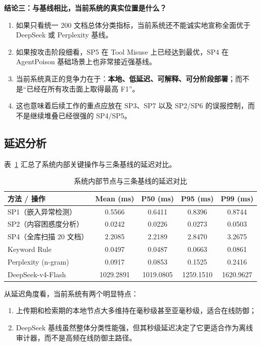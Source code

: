 \documentclass[11pt,a4paper]{ctexart}
\begin{document}
\textbf{结论三：与基线相比，当前系统的真实位置是什么？}
\begin{enumerate}[leftmargin=2em]
  \item 如果只看统一 200 文档总体分类指标，当前系统还不能诚实地宣称全面优于 DeepSeek 或 Perplexity 基线。
  \item 如果按攻击阶段细看，SP5 在 Tool Misuse 上已经达到最优，SP4 在 AgentPoison 基础场景上也非常接近强基线。
  \item 当前系统真正的竞争力在于：\textbf{本地、低延迟、可解释、可分阶段部署}；而不是“已经在所有攻击面上取得最高 F1”。
  \item 这也意味着后续工作的重点应放在 SP3、SP7 以及 SP2/SP6 的误报控制，而不是继续堆叠已经很强的 SP4/SP5。
\end{enumerate}

\subsection{延迟分析}
表~\ref{tab:type4-latency} 汇总了系统内部关键操作与三条基线的延迟对比。

\begin{table}[H]
\centering
\caption{系统内部节点与三条基线的延迟对比}
\label{tab:type4-latency}
\begin{tabular}{l c c c c}
\toprule
方法 / 操作 & Mean (ms) & P50 (ms) & P95 (ms) & P99 (ms) \\
\midrule
SP1（嵌入异常检测） & 0.5566 & 0.6411 & 0.8396 & 0.8744 \\
SP2（内容困惑度分析） & 0.0242 & 0.0226 & 0.0273 & 0.0503 \\
SP4（全库扫描 20 文档） & 2.2085 & 2.2189 & 2.8470 & 3.2675 \\
Keyword Rule & 0.0497 & 0.0487 & 0.0663 & 0.0861 \\
Perplexity (n-gram) & 0.0917 & 0.0853 & 0.1525 & 0.2416 \\
DeepSeek-v4-Flash & 1029.2891 & 1019.0805 & 1259.1510 & 1620.9627 \\
\bottomrule
\end{tabular}
\end{table}

从延迟角度看，当前系统有两个明显特点：
\begin{enumerate}[leftmargin=2em]
  \item 上传期和检索期的本地节点大多维持在毫秒级甚至亚毫秒级，适合在线防御；
  \item DeepSeek 基线虽然整体分类性能强，但其秒级延迟决定了它更适合作为离线审计器，而不是高频在线防御主路径。
\end{enumerate}
\end{document}
